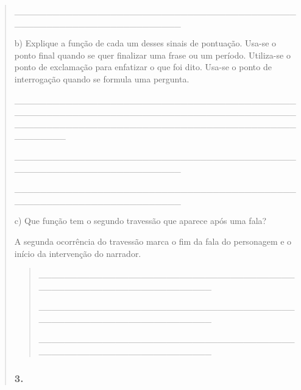 \begin{quote}
\begin{iteize}
\_\_\_\_\_\_\_\_\_\_\_\_\_\_\_\_\_\_\_\_\_\_\_\_\_\_\_\_\_\_\_\_\_\_\_\_\_\_\_\_\_\_\_\_\_\_\_\_\_\_\_\_\_\_\_\_\_\_\_\_\_\_\_\_\_\_\_\_\_\_

b) Explique a função de cada um desses sinais de pontuação. Usa-se o
ponto final quando se quer finalizar uma frase ou um período. Utiliza-se
o ponto de exclamação para enfatizar o que foi dito. Usa-se o ponto de
interrogação quando se formula uma pergunta.


\_\_\_\_\_\_\_\_\_\_\_\_\_\_\_\_\_\_\_\_\_\_\_\_\_\_\_\_\_\_\_\_\_\_\_\_\_\_\_\_\_\_\_\_\_\_\_\_\_\_\_\_\_\_\_\_\_\_\_\_\_\_\_\_\_\_\_\_\_\_\_\_\_\_\_\_\_\_\_\_\_\_\_\_\_\_\_\_\_\_\_\_\_\_\_\_\_\_\_\_\_\_\_\_\_\_\_\_\_\_\_\_\_\_\_\_\_\_\_\_\_\_\_\_\_\_\_\_\_\_\_\_\_\_\_\_\_\_\_\_

\_\_\_\_\_\_\_\_\_\_\_\_\_\_\_\_\_\_\_\_\_\_\_\_\_\_\_\_\_\_\_\_\_\_\_\_\_\_\_\_\_\_\_\_\_\_\_\_\_\_\_\_\_\_\_\_\_\_\_\_\_\_\_\_\_\_\_\_\_\_

\_\_\_\_\_\_\_\_\_\_\_\_\_\_\_\_\_\_\_\_\_\_\_\_\_\_\_\_\_\_\_\_\_\_\_\_\_\_\_\_\_\_\_\_\_\_\_\_\_\_\_\_\_\_\_\_\_\_\_\_\_\_\_\_\_\_\_\_\_\_

c) Que função tem o segundo travessão que aparece após uma fala?

A segunda ocorrência do travessão marca o fim da fala do personagem e o
início da intervenção do narrador.

\begin{quote}
\_\_\_\_\_\_\_\_\_\_\_\_\_\_\_\_\_\_\_\_\_\_\_\_\_\_\_\_\_\_\_\_\_\_\_\_\_\_\_\_\_\_\_\_\_\_\_\_\_\_\_\_\_\_\_\_\_\_\_\_\_\_\_\_\_\_\_

\_\_\_\_\_\_\_\_\_\_\_\_\_\_\_\_\_\_\_\_\_\_\_\_\_\_\_\_\_\_\_\_\_\_\_\_\_\_\_\_\_\_\_\_\_\_\_\_\_\_\_\_\_\_\_\_\_\_\_\_\_\_\_\_\_\_\_

\_\_\_\_\_\_\_\_\_\_\_\_\_\_\_\_\_\_\_\_\_\_\_\_\_\_\_\_\_\_\_\_\_\_\_\_\_\_\_\_\_\_\_\_\_\_\_\_\_\_\_\_\_\_\_\_\_\_\_\_\_\_\_\_\_\_\_
\end{quote}

\subsubsection{3. }\label{section-34}


\end{iteize}
\end{quote}
